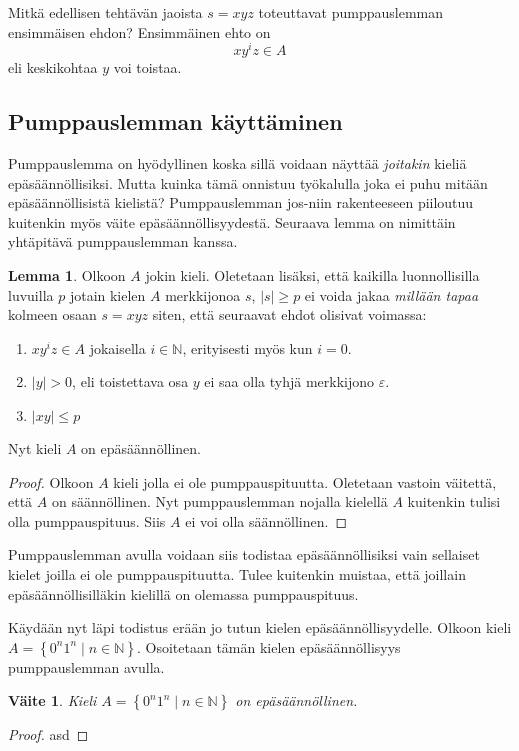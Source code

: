 \documentclass[a4paper,11pt]{article}
\newtheorem*{claim}{Väite}
\theoremstyle{definition}
\newtheorem*{lemma}{Lemma}
\newcommand{\set}[1]{{\left\{ #1 \right\}}}
\newcommand{\Nat}{\mathbb{N}}
\begin{document}
\begin{exercise}
    Mitkä edellisen tehtävän jaoista $s = xyz$ toteuttavat pumppauslemman
    ensimmäisen ehdon? Ensimmäinen ehto on
    \begin{equation*}
        xy^iz \in A
    \end{equation*}
    eli keskikohtaa $y$ voi toistaa.
\end{exercise}

\subsection*{Pumppauslemman käyttäminen}

Pumppauslemma on hyödyllinen koska sillä voidaan näyttää \emph{joitakin} kieliä
epäsäännöllisiksi. Mutta kuinka tämä onnistuu työkalulla joka ei puhu
mitään epäsäännöllisistä kielistä? Pumppauslemman jos-niin
rakenteeseen piiloutuu kuitenkin myös väite epäsäännöllisyydestä.
Seuraava lemma on nimittäin yhtäpitävä pumppauslemman kanssa.

\begin{lemma}
  Olkoon $A$ jokin kieli. Oletetaan lisäksi, että kaikilla
  luonnollisilla luvuilla $p$ jotain kielen $A$ merkkijonoa $s$, $|s|
  \ge p$ ei voida jakaa \emph{millään tapaa} kolmeen osaan $s = xyz$
  siten, että seuraavat ehdot olisivat voimassa:
  \begin{enumerate}
  \item
    $xy^iz \in A$ jokaisella $i \in \Nat$, erityisesti myös kun $i =
    0$.
  \item
    $|y| > 0$, eli toistettava osa $y$ ei saa olla tyhjä merkkijono
    $\varepsilon$.
  \item
    $|xy| \leq p$
  \end{enumerate}
  Nyt kieli $A$ on epäsäännöllinen.
\end{lemma}
\begin{proof}
  Olkoon $A$ kieli jolla ei ole pumppauspituutta. Oletetaan vastoin
  väitettä, että $A$ on säännöllinen. Nyt pumppauslemman nojalla
  kielellä $A$ kuitenkin tulisi olla pumppauspituus. Siis $A$ ei voi
  olla säännöllinen.
\end{proof}

Pumppauslemman avulla voidaan siis todistaa epäsäännöllisiksi vain
sellaiset kielet joilla ei ole pumppauspituutta. Tulee kuitenkin
muistaa, että joillain epäsäännöllisilläkin kielillä on olemassa
pumppauspituus.

Käydään nyt läpi todistus erään jo tutun kielen epäsäännöllisyydelle.
Olkoon kieli $A = \set{0^n1^n \mid n \in \Nat}$. Osoitetaan tämän
kielen epäsäännöllisyys pumppauslemman avulla.
%
\begin{claim}
    Kieli $A = \set{0^n1^n \mid n \in \Nat}$ on epäsäännöllinen.
\end{claim}
\begin{proof}
    asd
\end{proof}
\end{document}

